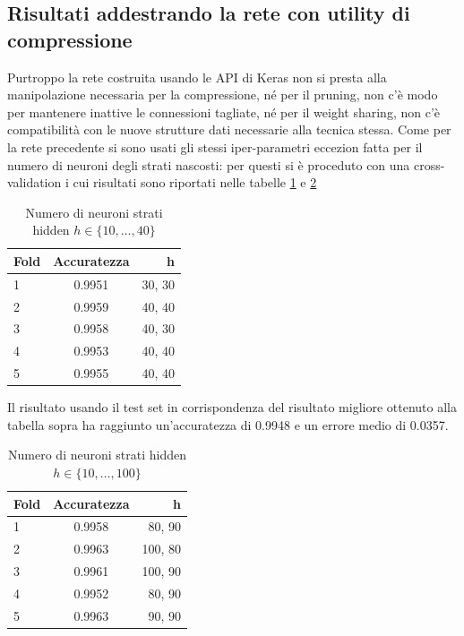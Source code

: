 \documentclass[12pt]{report}
\begin{document}
\par\null\par
\par\null\par

\subsection{Risultati addestrando la rete con utility di compressione}\label{reteAdHoc}
Purtroppo la rete costruita usando le API di Keras non si presta alla manipolazione necessaria per la compressione, né per il pruning, non c’è modo per mantenere inattive le connessioni tagliate, né per il weight sharing, non c’è compatibilità con le nuove strutture dati necessarie alla tecnica stessa.
Come per la rete precedente si sono usati gli stessi iper-parametri eccezion fatta per il numero di neuroni degli strati nascosti: per questi si è proceduto con una cross-validation i cui risultati sono riportati nelle tabelle \ref{hoc2_10_40} e \ref{hoc2_10_100}
\par\null\par
\begin{table}[H]
\begin{center}
\begin{tabular}{lcr}
\toprule
Fold & Accuratezza & h \\
\midrule
1 & 0.9951 & 30, 30\\
2 & 0.9959 & 40, 40\\
3 & 0.9958 & 40, 30\\
4 & 0.9953 & 40, 40\\
5 & 0.9955 & 40, 40\\
\bottomrule
\end{tabular}
\end{center}
\caption{Numero di neuroni strati hidden $h \in \{10, \dots, 40 \}$}
\label{hoc2_10_40}
\end{table}

Il risultato usando il test set in corrispondenza del risultato migliore ottenuto alla tabella sopra ha raggiunto un'accuratezza di 0.9948 e un errore medio di 0.0357.

\null\par\null

\begin{table}[H]
\begin{center}
\begin{tabular}{lcr}
\toprule
Fold & Accuratezza & h \\
\midrule
1 & 0.9958 & 80, 90\\
2 & 0.9963 & 100, 80\\
3 & 0.9961 & 100, 90\\
4 & 0.9952 & 80, 90\\
5 & 0.9963 & 90, 90\\
\bottomrule
\end{tabular}
\end{center}
\caption{Numero di neuroni strati hidden $h \in \{10, \dots, 100 \}$}
\label{hoc2_10_100}
\end{table}
\end{document}

